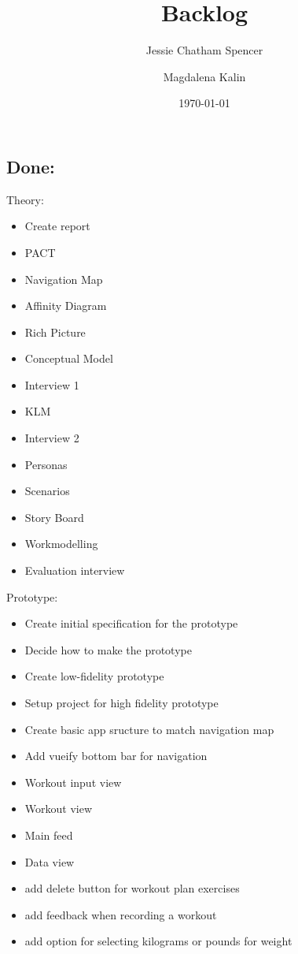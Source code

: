 \documentclass{article}
\title{Backlog}
\author{Jessie Chatham Spencer \and Magdalena Kalin}
\date{\today}
\begin{document}
\maketitle

\subsection*{Done:}
Theory:
\begin{itemize}
\item Create report
\item PACT 
\item Navigation Map
\item Affinity Diagram
\item Rich Picture
\item Conceptual Model
\item Interview 1
\item KLM
\item Interview 2
\item Personas
\item Scenarios
\item Story Board
\item Workmodelling
\item Evaluation interview
\end{itemize}
Prototype:
\begin{itemize}
\item Create initial specification for the prototype
\item Decide how to make the prototype
\item Create low-fidelity prototype
\item Setup project for high fidelity prototype
\item Create basic app sructure to match navigation map
\item Add vueify bottom bar for navigation
\item Workout input view
\item Workout view
\item Main feed
\item Data view
\item add delete button for workout plan exercises
\item add feedback when recording a workout
\item add option for selecting kilograms or pounds for weight
\end{itemize}
\end{document}
